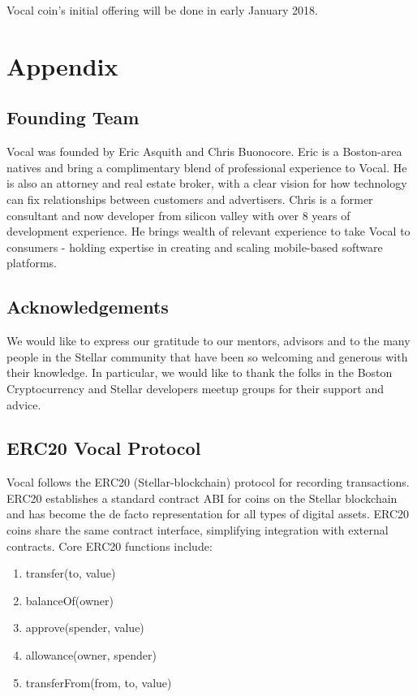 \documentclass[conference]{IEEEtran}
\begin{document}
   Vocal coin's initial offering will be done in early January 2018.

    
    \section*{Appendix}

    \subsection{Founding Team}
   Vocal was founded by Eric Asquith and Chris Buonocore. Eric is a Boston-area natives and bring a complimentary blend of professional experience to Vocal. He is also an attorney and real estate broker, with a clear vision for how technology can fix relationships between customers and advertisers. Chris is a former consultant and now developer from silicon valley with over 8 years of development experience. He brings wealth of relevant experience to take Vocal to consumers - holding expertise in creating and scaling mobile-based software platforms.  

    \subsection{Acknowledgements}

    We would like to express our gratitude to our mentors, advisors and to the many people in the Stellar community that have been so welcoming and generous with their knowledge. 
    In particular, we would like to thank the folks in the Boston Cryptocurrency and Stellar developers meetup groups for their support and advice.

    \subsection{ERC20 Vocal Protocol}
   Vocal follows the ERC20 (Stellar-blockchain) protocol for recording transactions.
    ERC20 establishes a standard contract ABI for coins on the Stellar blockchain and has become the de facto representation for all types of digital assets. ERC20 coins share the same contract interface, simplifying integration with external contracts.
    Core ERC20 functions include:

    \begin{enumerate}
    \item transfer(to, value)
    \item balanceOf(owner)
    \item approve(spender, value)
    \item allowance(owner, spender)
    \item transferFrom(from, to, value)
    \end{enumerate}
\end{document}
